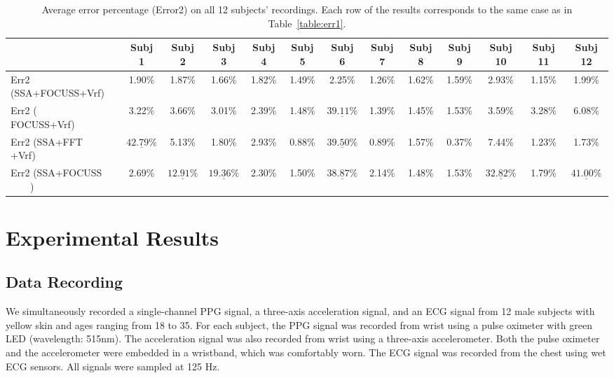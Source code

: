 \documentclass[10pt,twocolumn]{IEEEtran}
\begin{document}
\begin{table*}[t]
\renewcommand{\arraystretch}{1.2}
\caption{Average error percentage (Error2) on all 12 subjects' recordings. Each row of the results corresponds to the same case as in Table~\ref{table:err1}.}
\label{table:err2}
\centering
\begin{tabular}{l|c|c|c|c|c|c|c|c|c|c|c|c}
\toprule
       &  Subj 1      & Subj 2   &  Subj 3   &  Subj 4   &Subj 5  &Subj  6  &Subj 7  &Subj  8  &Subj 9  &Subj 10 &Subj 11 & Subj 12\\
\midrule
Err2  (SSA+FOCUSS+Vrf)       &  1.90\%   &  1.87\%   &  1.66\%  & 1.82\%    &  1.49\%   &  2.25\% & 1.26\% &  1.62\% &  1.59\% &  2.93\% & 1.15\% & 1.99\%\\
\hline
Err2  ($\quad\quad\;$FOCUSS+Vrf)  &  3.22\%    & 3.66\%     & 3.01\%    & 2.39\%     &  1.48\%    & {\color{red}$\underline{39.11\%}$}   & 1.39\%  & 1.45\%   & 1.53\%   & 3.59\%   & 3.28\%   &  6.08\% \\
\hline
Err2  (SSA+FFT$\quad\quad$+Vrf)       &  {\color{red}$\underline{42.79\%}$}   &  5.13\%   &  1.80\%  & 2.93\%    &  0.88\%   &  {\color{red}$\underline{39.50\%}$} & 0.89\% &  1.57\% &  0.37\% &  7.44\% & 1.23\% & 1.73\%\\
\hline
Err2  (SSA+FOCUSS$\quad\quad$)       &  2.69\%   &  {\color{red}$\underline{12.91\%}$}   &  {\color{red}$\underline{19.36\%}$}  & 2.30\%    &  1.50\%   &  {\color{red}$\underline{38.87\%}$} & 2.14\% &  1.48\% &  1.53\% &  {\color{red}$\underline{32.82\%}$} & 1.79\% & {\color{red}$\underline{41.00\%}$} \\
\bottomrule
\end{tabular}
\end{table*}









\section{Experimental Results}
\label{sec:experiments}

\subsection{Data Recording}

We simultaneously recorded a single-channel PPG signal, a three-axis acceleration signal, and an ECG signal from 12 male subjects with yellow skin and ages ranging from 18 to 35.
For each subject, the PPG signal was recorded from wrist using a  pulse oximeter   with green LED (wavelength: 515nm). The acceleration signal was also recorded from  wrist using a three-axis accelerometer. Both the pulse oximeter and the accelerometer were embedded in a wristband, which was comfortably worn. The ECG signal was recorded from the chest using wet ECG sensors. All signals were sampled at 125 Hz.
\end{document}
